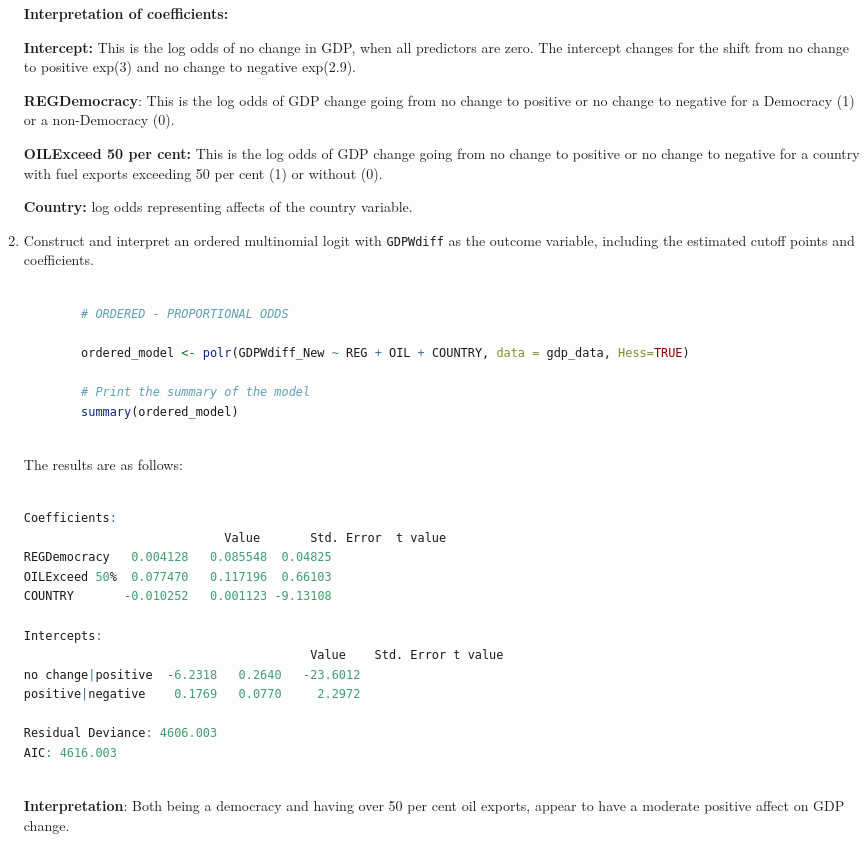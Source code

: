 \documentclass[12pt,letterpaper]{article}
\begin{document}
\begin{enumerate}
\begin{lstlisting}[language=R]
		\end{lstlisting}
\vspace{.5cm}
		
\textbf{	Interpretation of coefficients:}
	
\textbf{	Intercept:} This is the log odds of no change in GDP, when all predictors are zero. The intercept changes for the shift from no change to positive exp(3) and no change to negative exp(2.9). 
	
\textbf{	REGDemocracy}: This is the log odds of GDP change going from no change to positive or no change to negative for a Democracy (1) or a non-Democracy (0). 
	
	\textbf{OILExceed 50 per cent:} This is the log odds of GDP change going from no change to positive or no change to negative for a country with fuel exports exceeding 50 per cent (1) or without (0).
	
\textbf{	Country:} log odds representing affects of the country variable.

\vspace{1.7cm}
	
	\item Construct and interpret an ordered multinomial logit with \texttt{GDPWdiff} as the outcome variable, including the estimated cutoff points and coefficients.
	
	\begin{lstlisting}[language=R]
		
		# ORDERED - PROPORTIONAL ODDS
		
		ordered_model <- polr(GDPWdiff_New ~ REG + OIL + COUNTRY, data = gdp_data, Hess=TRUE)
		
		# Print the summary of the model
		summary(ordered_model)
				
	\end{lstlisting}
	
	The results are as follows:
	
		\begin{lstlisting}[language=R]
		
Coefficients:
							Value 		Std. Error  t value
REGDemocracy   0.004128   0.085548  0.04825
OILExceed 50%  0.077470   0.117196  0.66103
COUNTRY       -0.010252   0.001123 -9.13108

Intercepts:
										Value    Std. Error t value 
no change|positive  -6.2318   0.2640   -23.6012
positive|negative    0.1769   0.0770     2.2972

Residual Deviance: 4606.003 
AIC: 4616.003 
		
	\end{lstlisting}

\textbf{Interpretation}: Both being a democracy and having over 50 per cent oil exports, appear to have a moderate positive affect on GDP change.

\end{enumerate}
\end{document}
